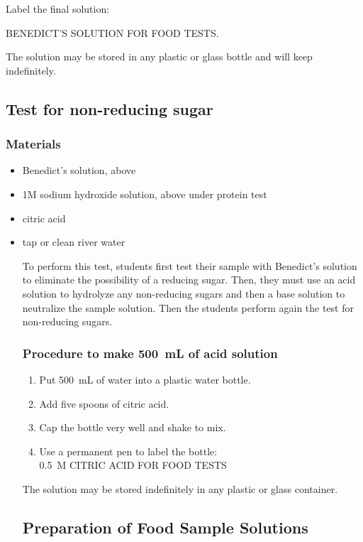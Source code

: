 Label the final solution:

\begin{center}	
BENEDICT'S SOLUTION FOR FOOD TESTS.
\end{center}

The solution may be stored in any plastic or glass bottle and will keep indefinitely.

\subsection{Test for non-reducing sugar}

\subsubsection{Materials}
\begin{itemize}
\item{Benedict's solution, above}
\item{1M sodium hydroxide solution, above under protein test}
\item{citric acid}
\item{tap or clean river water}

To perform this test, students first test their sample with Benedict's solution to eliminate the possibility of a reducing sugar. Then, they must use an acid solution to hydrolyze any non-reducing sugars and then a base solution to neutralize the sample solution. Then the students perform again the test for non-reducing sugars.

\subsubsection{Procedure to make 500~mL of acid solution}
\begin{enumerate}
\item{Put 500~mL of water into a plastic water bottle.}
\item{Add five spoons of citric acid.}
\item{Cap the bottle very well and shake to mix.}
\item{Use a permanent pen to label the bottle:\\
0.5~M CITRIC ACID FOR FOOD TESTS}
\end{enumerate}

The solution may be stored indefinitely in any plastic or glass container.

\subsection{Preparation of Food Sample Solutions}


\end{itemize}
